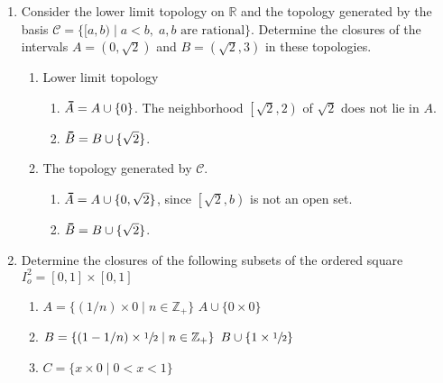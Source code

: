\documentclass[12pt,letterpaper]{article}
\newcommand{\n}{\break}
\newcommand{\Wlog}{without loss of generality}
\newcommand\thickbar[1]{\accentset{\rule{.4em}{.8pt}}{#1}}
\let\bar\thickbar
\newcommand{\T}{\ensuremath{\mathcal{T}}}
\begin{document}
\begin{enumerate}
\begin{enumerate}[label=\roman*)]
    \begin{enumerate}[label=(\alph*)]
      \item $\bar{K}=[0,\infty)$, since for all points $x$ in that interval, all of their open neighborhoods must include an element larger than $x$, and all elements smaller than $x$. 
      \item Given points $a,b$ suppose, \Wlog , that $a<b$. All neighborhoods of $b$ include everything less than $b$, including $a$. This space does not follow the $\T_1$ axiom, because the set $\{a\}$ is not closed for any $a$. 
    \end{enumerate}
  \end{enumerate}
  \item Consider the lower limit topology on $\mathbb{R}$ and the topology generated by the basis $\mathcal{C}=\{[a,b)\;|\; a<b,\; a,b \text{ are rational}\}$. Determine the closures of the intervals $A=(0,\sqrt{2})$ and $B=(\sqrt{2},3)$ in these topologies.
  \begin{enumerate}
    \item Lower limit topology
    \begin{enumerate}
      \item $\bar{A} = A\cup \{0\}$. The neighborhood $\left[\sqrt{2},2\right)$ of $\sqrt{2}$ does not lie in $A$.
      \item $\bar{B} = B\cup \{\sqrt{2}\}$.
    \end{enumerate}
    \item The topology generated by $\mathcal{C}$.
    \begin{enumerate}
      \item $\bar{A} = A\cup \{0,\sqrt{2}\}$, since $\left[\sqrt{2}, b\right)$ is not an open set.
      \item $\bar{B} = B\cup \{\sqrt{2}\}$.
    \end{enumerate}
  \end{enumerate}
  \item Determine the closures of the following subsets of the ordered square $I^2_o = [0,1]\times [0,1]$
  \begin{enumerate}
    \item $A=\{(1/n)\times 0 \;|\; n\in\mathbb{Z}_+\}$\hspace{5in}\n
    \indent $A\cup \{0\times 0\}$
    \item $B=\{(1-1/n)\times \sfrac{1}{2}\;|\;n\in\mathbb{Z}_+\}$\hspace{5in}\n
    \indent $B\cup \{1\times \sfrac{1}{2}\}$
    \item $C=\{x\times 0 \;|\; 0<x<1\}$\hspace{5in}\n

\end{enumerate}
\end{enumerate}
\end{document}
